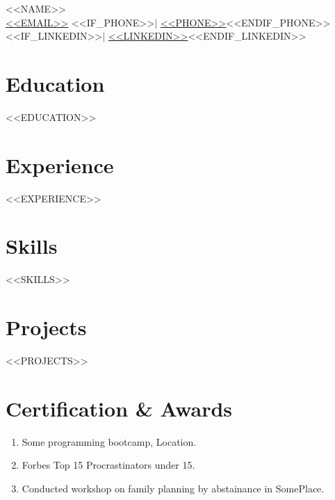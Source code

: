 \documentclass[11pt]{article}
\begin{document}
\begin{center}
    {\fontsize{36}{36}\selectfont\interthin <<NAME>>} \\ \bigskip
    {\color{icnclr}\faEnvelope[regular]} \href{mailto:<<EMAIL>>}{<<EMAIL>>} <<IF_PHONE>>$|$ 
    {\color{icnclr}} \href{tel:<<PHONE>>}{<<PHONE>>}<<ENDIF_PHONE>> <<IF_LINKEDIN>>$|$
    {\color{icnclr}\faLinkedinIn} \href{<<LINKEDIN>>}{<<LINKEDIN>>}<<ENDIF_LINKEDIN>>
\end{center}

\section{Education}
<<EDUCATION>>

\section{Experience}
<<EXPERIENCE>>

\section{Skills}
<<SKILLS>>

\section{Projects}
<<PROJECTS>>

\section{Certification \& Awards}
\begin{enumerate}[itemsep=0pt]
  \item [2023] Some programming bootcamp, Location.
  \item [2022] Forbes Top 15 Procrastinators under 15.
  \item [2021] Conducted workshop on family planning by abstainance in SomePlace.
\end{enumerate}
\end{document}
